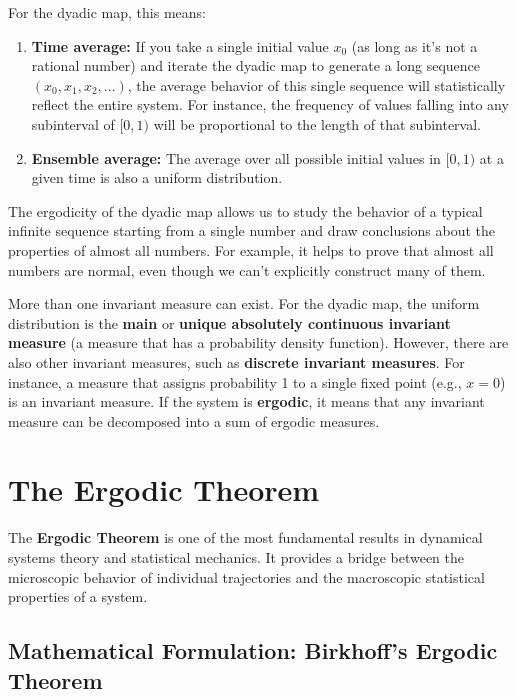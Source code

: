\documentclass[12pt,a4paper]{article}
\begin{document}
For the dyadic map, this means:

\begin{enumerate}
    \item \textbf{Time average:} If you take a single initial value $x_0$ (as long as it's not a rational number) and iterate the dyadic map to generate a long sequence $(x_0, x_1, x_2, ...)$, the average behavior of this single sequence will statistically reflect the entire system. For instance, the frequency of values falling into any subinterval of $[0, 1)$ will be proportional to the length of that subinterval.
    \item \textbf{Ensemble average:} The average over all possible initial values in $[0, 1)$ at a given time is also a uniform distribution.
\end{enumerate}

The ergodicity of the dyadic map allows us to study the behavior of a typical infinite sequence starting from a single number and draw conclusions about the properties of almost all numbers. For example, it helps to prove that almost all numbers are normal, even though we can't explicitly construct many of them.

More than one invariant measure can exist. For the dyadic map, the uniform distribution is the \textbf{main} or \textbf{unique absolutely continuous invariant measure} (a measure that has a probability density function). However, there are also other invariant measures, such as \textbf{discrete invariant measures}. For instance, a measure that assigns probability 1 to a single fixed point (e.g., $x=0$) is an invariant measure. If the system is \textbf{ergodic}, it means that any invariant measure can be decomposed into a sum of ergodic measures.

\section{The Ergodic Theorem}

The \textbf{Ergodic Theorem} is one of the most fundamental results in dynamical systems theory and statistical mechanics. It provides a bridge between the microscopic behavior of individual trajectories and the macroscopic statistical properties of a system.

\subsection{Mathematical Formulation: Birkhoff's Ergodic Theorem}
\end{document}
